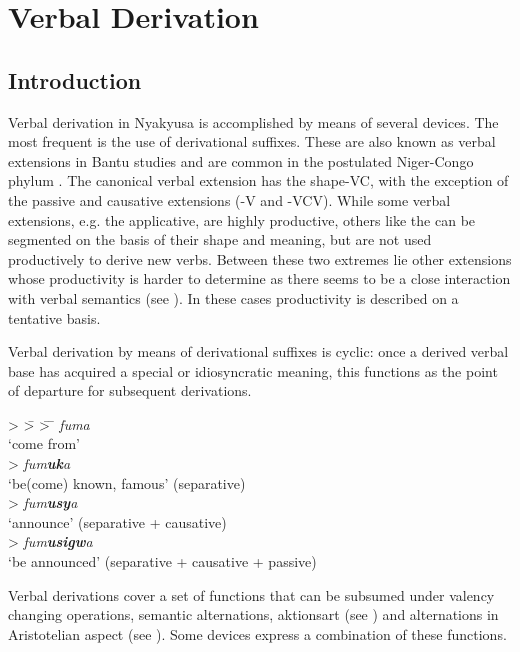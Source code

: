\chapter{Verbal Derivation}\label{VerbalDerivation}
\section{Introduction}
Verbal derivation in Nyakyusa is accomplished by means of several devices. The most frequent is the use of derivational suffixes. These are also known as verbal extensions in Bantu studies \citep{SchadebergT2003a} and are common in the postulated Niger-Congo phylum \citep{HymanL2007}. The canonical verbal extension has the shape\mbox{-VC}, with the exception of the passive and causative extensions (\mbox{-V} and \mbox{-VCV}). While some verbal extensions, e.g. the applicative, are highly productive, others like the  can be segmented on the basis of their shape and meaning, but are not used productively to derive new verbs. Between these two extremes lie other extensions whose productivity is harder to determine as there seems to be a close interaction with verbal semantics (see \citealt{FleischA2000}). In these cases productivity is described on a tentative basis.

Verbal derivation by means of derivational suffixes is cyclic: once a derived verbal base has acquired a special or idiosyncratic meaning, this functions as the point of departure for subsequent derivations. 
\begin{exe}
\ex
\begin{tabbing}
 > \= > \= > \=\kill
\textit{fuma}\\
\lq come from'\\
 > \textit{fum\textbf{uk}a} \\
\>\lq be(come) known, famous' (separative)\\
\> > \textit{fum\textbf{usy}a}\\
\> \>\lq announce' (separative + causative)\\
\>\> > \textit{fum\textbf{usigw}a}\\
\>\>\> \lq be announced' (separative + causative + passive)
\end{tabbing}
\end{exe}

Verbal derivations cover a set of functions that can be subsumed under valency changing operations, semantic alternations, aktionsart (see ) and alternations in Aristotelian aspect (see ). Some devices express a combination of these functions.

